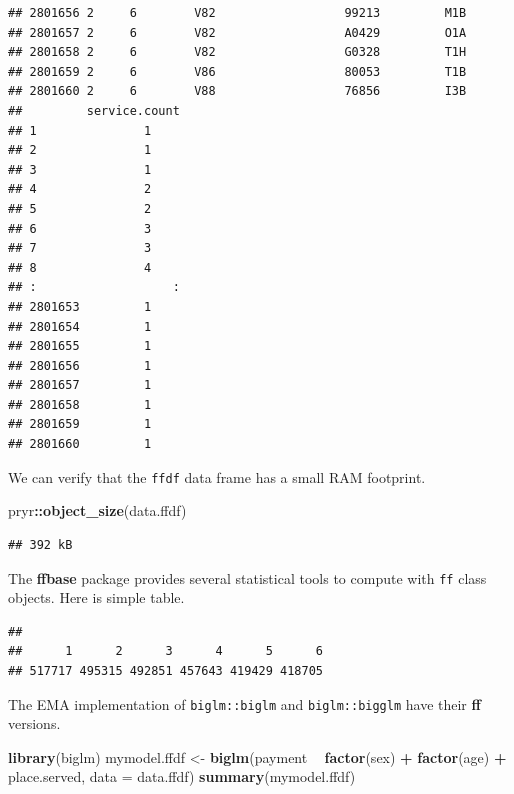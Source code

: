 \documentclass[]{book}
\newenvironment{Shaded}{\begin{snugshade}}{\end{snugshade}}
\newcommand{\KeywordTok}[1]{\textcolor[rgb]{0.13,0.29,0.53}{\textbf{#1}}}
\newcommand{\DataTypeTok}[1]{\textcolor[rgb]{0.13,0.29,0.53}{#1}}
\newcommand{\StringTok}[1]{\textcolor[rgb]{0.31,0.60,0.02}{#1}}
\newcommand{\OperatorTok}[1]{\textcolor[rgb]{0.81,0.36,0.00}{\textbf{#1}}}
\newcommand{\NormalTok}[1]{#1}
\theoremstyle{definition}
\theoremstyle{definition}
\theoremstyle{definition}
\theoremstyle{remark}
\begin{document}
\begin{verbatim}
## 2801656 2     6        V82                  99213         M1B  
## 2801657 2     6        V82                  A0429         O1A  
## 2801658 2     6        V82                  G0328         T1H  
## 2801659 2     6        V86                  80053         T1B  
## 2801660 2     6        V88                  76856         I3B  
##         service.count
## 1               1    
## 2               1    
## 3               1    
## 4               2    
## 5               2    
## 6               3    
## 7               3    
## 8               4    
## :                   :
## 2801653         1    
## 2801654         1    
## 2801655         1    
## 2801656         1    
## 2801657         1    
## 2801658         1    
## 2801659         1    
## 2801660         1
\end{verbatim}

We can verify that the \texttt{ffdf} data frame has a small RAM
footprint.

\begin{Shaded}
\begin{Highlighting}[]
\NormalTok{pryr}\OperatorTok{::}\KeywordTok{object_size}\NormalTok{(data.ffdf)}
\end{Highlighting}
\end{Shaded}

\begin{verbatim}
## 392 kB
\end{verbatim}

The \textbf{ffbase} package provides several statistical tools to
compute with \texttt{ff} class objects. Here is simple table.

\begin{Shaded}
\end{Shaded}

\begin{verbatim}
## 
##      1      2      3      4      5      6 
## 517717 495315 492851 457643 419429 418705
\end{verbatim}

The EMA implementation of \texttt{biglm::biglm} and
\texttt{biglm::bigglm} have their \textbf{ff} versions.

\begin{Shaded}
\begin{Highlighting}[]
\KeywordTok{library}\NormalTok{(biglm)}
\NormalTok{mymodel.ffdf <-}\StringTok{ }\KeywordTok{biglm}\NormalTok{(payment }\OperatorTok{~}\StringTok{ }\KeywordTok{factor}\NormalTok{(sex) }\OperatorTok{+}\StringTok{ }\KeywordTok{factor}\NormalTok{(age) }\OperatorTok{+}\StringTok{ }\NormalTok{place.served, }
                              \DataTypeTok{data =}\NormalTok{ data.ffdf)}
\KeywordTok{summary}\NormalTok{(mymodel.ffdf)}
\end{Highlighting}
\end{Shaded}
\end{document}

